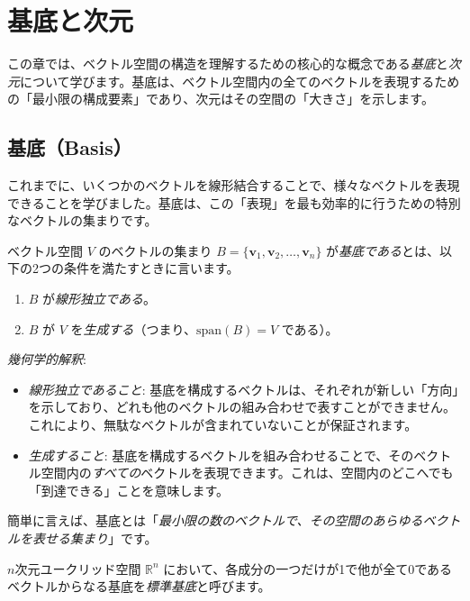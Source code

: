 \section{基底と次元}
この章では、ベクトル空間の構造を理解するための核心的な概念である\emph{基底}と\emph{次元}について学びます。基底は、ベクトル空間内の全てのベクトルを表現するための「最小限の構成要素」であり、次元はその空間の「大きさ」を示します。

\subsection{基底（Basis）}
これまでに、いくつかのベクトルを線形結合することで、様々なベクトルを表現できることを学びました。基底は、この「表現」を最も効率的に行うための特別なベクトルの集まりです。
\begin{dfn}[基底]
ベクトル空間 $V$ のベクトルの集まり $B = \{\bm{v}_1, \bm{v}_2, \ldots, \bm{v}_n\}$ が\emph{基底である}とは、以下の2つの条件を満たすときに言います。
\begin{enumerate}
\item $B$ が\emph{線形独立である}。
\item $B$ が $V$ を\emph{生成する}（つまり、$\text{span}(B) = V$ である）。
\end{enumerate}
\end{dfn}

\emph{幾何学的解釈}:
\begin{itemize}
\item \emph{線形独立であること}: 基底を構成するベクトルは、それぞれが新しい「方向」を示しており、どれも他のベクトルの組み合わせで表すことができません。これにより、無駄なベクトルが含まれていないことが保証されます。
\item \emph{生成すること}: 基底を構成するベクトルを組み合わせることで、そのベクトル空間内の\emph{すべての}ベクトルを表現できます。これは、空間内のどこへでも「到達できる」ことを意味します。
\end{itemize}

簡単に言えば、基底とは「\emph{最小限の数のベクトルで、その空間のあらゆるベクトルを表せる集まり}」です。

\begin{dfn}[標準基底]
$n$次元ユークリッド空間 $\mathbb{R}^n$ において、各成分の一つだけが1で他が全て0であるベクトルからなる基底を\emph{標準基底}と呼びます。
\end{dfn}

